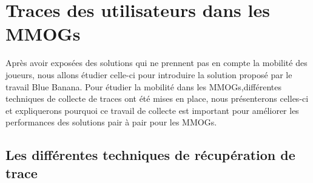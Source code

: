 \newpage
\section{Traces des utilisateurs dans les MMOGs}
	\label{trace}
 	Après avoir exposées des solutions qui ne prennent pas en compte la mobilité des joueurs, nous allons étudier celle-ci pour introduire la solution proposé par le travail Blue Banana. Pour étudier la mobilité dans les MMOGs,différentes techniques de collecte de traces ont été mises en place, nous présenterons celles-ci et expliquerons pourquoi ce travail de collecte est important pour améliorer les performances des solutions pair à pair pour les MMOGs.
	\subsection{Les différentes techniques de récupération de trace}
